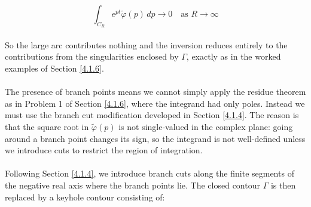 \begin{equation}
    \int_{C_R} e^{pt}\tilde{\varphi}(p)\, dp \to 0 \quad \text{as } R \to \infty
\end{equation}
\\
So the large arc contributes nothing and the inversion reduces entirely to the 
contributions from the singularities enclosed by $\Gamma$, exactly as in the 
worked examples of Section \ref{4.1.6}.
\\
\\
The presence of branch points means we cannot simply apply the residue theorem 
as in Problem 1 of Section \ref{4.1.6}, where the integrand had only poles. Instead we 
must use the branch cut modification developed in Section \ref{4.1.4}. The reason is 
that the square root in $\tilde{\varphi}(p)$ is not single-valued in the complex 
plane: going around a branch point changes its sign, so the integrand is not 
well-defined unless we introduce cuts to restrict the region of integration.
\\
\\
Following Section \ref{4.1.4}, we introduce branch cuts along the finite segments of 
the negative real axis where the branch points lie. The closed contour $\Gamma$ 
is then replaced by a keyhole contour consisting of:

